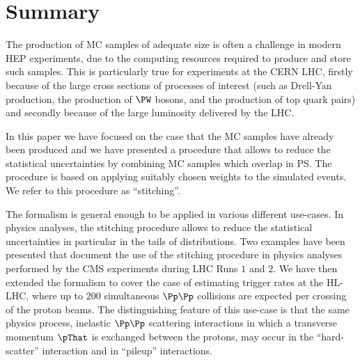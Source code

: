 \section{Summary}
\label{sec:summary}

The production of MC samples of adequate size is often a challenge in modern HEP experiments,
due to the computing resources required to produce and store such samples.
This is particularly true for experiments at the CERN LHC,
firstly because of the large cross sections of processes of interest (such as Drell-Yan production, the production of $\PW$ bosons, and the production of top quark pairs)
and secondly because of the large luminosity delivered by the LHC.

In this paper we have focused on the case that the MC samples have already been produced
and we have presented a procedure that allows to reduce the statistical uncertainties 
by combining MC samples which overlap in PS.
The procedure is based on applying suitably chosen weights to the simulated events.
We refer to this procedure as ``stitching''.

The formalism is general enough to be applied in various different use-cases.
In physics analyses, the stitching procedure allows to reduce the statistical uncertainties in particular in the tails of distributions.
Two examples have been presented that document the use of the stitching procedure in physics analyses performed by the CMS experiments during LHC Runs $1$ and $2$.
We have then extended the formalism to cover the case of estimating trigger rates at the HL-LHC,
where up to $200$ simultaneous $\Pp\Pp$ collisions are expected per crossing of the proton beams.
The distinguishing feature of this use-case is that the same physics process, 
inelastic $\Pp\Pp$ scattering interactions in which a transverse momentum $\pThat$ is exchanged between the protons,
may occur in the ``hard-scatter'' interaction and in ``pileup'' interactions.
